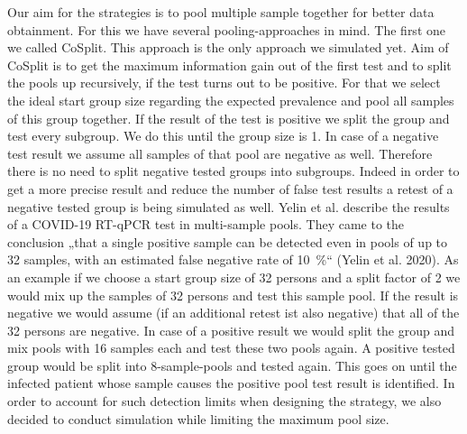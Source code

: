 \documentclass[fleqn,10pt]{wlscirep}
\begin{document}
Our aim for the strategies is to pool multiple sample together for better data obtainment. For this we have several pooling-approaches in mind.
The first one we called CoSplit. This approach is the only approach we simulated yet. Aim of CoSplit is to get the maximum information gain out of the first test and to split the pools up recursively, if the test turns out to be positive. For that we select the ideal start group size regarding the expected prevalence and pool all samples of this group together. If the result of the test is positive we split the group and test every subgroup. We do this until the group size is 1. In case of a negative test result we assume all samples of that pool are negative as well. Therefore there is no need to split negative tested groups into subgroups. Indeed in order to get a more precise result and reduce the number of false test results a retest of a negative tested group is being simulated as well. 
Yelin et al. describe the results of a COVID-19 RT-qPCR test in multi-sample pools. They came to the conclusion „that a single positive sample can be detected even in pools of up to 32 samples, with an estimated false negative rate of \SI{10}{\percent}“ (Yelin et al. 2020). 
As an example if we choose a start group size of 32 persons and a split factor of 2 we would mix up the samples of 32 persons and test this sample pool. If the result is negative we would assume (if an additional retest ist also negative) that all of the 32 persons are negative. In case of a positive result we would split the group and mix pools with 16 samples each and test these two pools again. A positive tested group would be split into 8-sample-pools and tested again. This goes on until the infected patient whose sample causes the positive pool test result is identified. In order to account for such detection limits when designing the strategy, we also decided to conduct simulation while limiting the maximum pool size.
\end{document}
